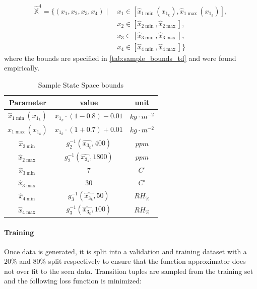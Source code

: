 \begin{equation}\label{eq:state_space}
\begin{split}
\hat{\mathbb{X}}^4 = \{ (x_1, x_2, x_3, x_4) \mid\ & x_1 \in [\hat{x}_{1\min}(x_{1_k}), \hat{x}_{1\max}(x_{1_k})], \\
& x_2 \in [\hat{x}_{2\min}, \hat{x}_{2\max}], \\
& x_3 \in [\hat{x}_{3\min}, \hat{x}_{3\max}], \\
& x_4 \in [\hat{x}_{4\min}, \hat{x}_{4\max}] \}
\end{split}
\end{equation}
where the bounds are specified in \autoref{tab:sample_bounds_td} and were found empirically.

\begin{table}[H]
    \centering
    \begin{tabular}{|c|c|c|}
    \hline
        Parameter& value& unit\\
        \hline
        $\hat{x}_{1\min}(x_{1_k})$ & $x_{1_k} \cdot (1-0.8) - 0.01 $ & $kg \cdot m^{-2}$\\
        $\hat{x}_{1\max}(x_{1_k})$ &$x_{1_k} \cdot (1+0.7) + 0.01 $ & $kg \cdot m^{-2}$\\
        $\hat{x}_{2\min}$ & $g_2^{-1} (\hat{x_{3_k}},400)$& $ppm$ \\
        $\hat{x}_{2\max}$ & $g_2^{-1} (\hat{x_{3_k}},1800)$& $ppm$ \\
        $\hat{x}_{3\min}$ &$7 $& $C^\circ$ \\
        $\hat{x}_{3\max}$ &$30$ &$C^\circ$\\
        $\hat{x}_{4\min}$ &$g_3^{-1} (\hat{x_{3_k}},50)$& $RH_{\%}$ \\
        $\hat{x}_{4\max}$ &$g_3^{-1} (\hat{x_{3_k}},100)$& $RH_{\%}$ \\
        \hline
    \end{tabular}
    \caption{Sample State Space bounds}
    \label{tab:sample_bounds_td}
\end{table}


\paragraph{Training}
Once data is generated, it is split into a validation and training dataset with a $20\%$ and $80\%$ split respectively to ensure that the function approximator does not over fit to the seen data. Transition tuples are sampled from the training set and the following loss function is minimized:

